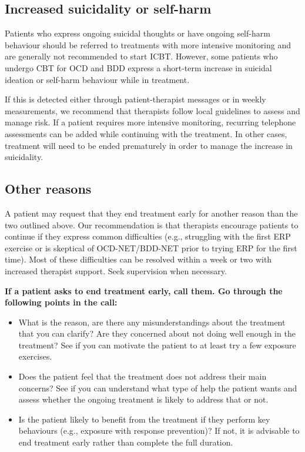 \documentclass[]{book}
\providecommand{\tightlist}{%
  \setlength{\itemsep}{0pt}\setlength{\parskip}{0pt}}
\theoremstyle{definition}
\theoremstyle{definition}
\theoremstyle{definition}
\theoremstyle{remark}
\begin{document}
\hypertarget{increased-suicidality-or-self-harm}{%
\subsection{Increased suicidality or
self-harm}\label{increased-suicidality-or-self-harm}}

Patients who express ongoing suicidal thoughts or have ongoing self-harm
behaviour should be referred to treatments with more intensive
monitoring and are generally not recommended to start ICBT. However,
some patients who undergo CBT for OCD and BDD express a short-term
increase in suicidal ideation or self-harm behaviour while in treatment.

If this is detected either through patient-therapist messages or in
weekly measurements, we recommend that therapists follow local
guidelines to assess and manage risk. If a patient requires more
intensive monitoring, recurring telephone assessments can be added while
continuing with the treatment. In other cases, treatment will need to be
ended prematurely in order to manage the increase in suicidality.

\hypertarget{other-reasons}{%
\subsection{Other reasons}\label{other-reasons}}

A patient may request that they end treatment early for another reason
than the two outlined above. Our recommendation is that therapists
encourage patients to continue if they express common difficulties
(e.g., struggling with the first ERP exercise or is skeptical of
OCD-NET/BDD-NET prior to trying ERP for the first time). Most of these
difficulties can be resolved within a week or two with increased
therapist support. Seek supervision when necessary.

\textbf{If a patient asks to end treatment early, call them. Go through
the following points in the call:}

\begin{itemize}
\tightlist
\item
  What is the reason, are there any misunderstandings about the
  treatment that you can clarify? Are they concerned about not doing
  well enough in the treatment? See if you can motivate the patient to
  at least try a few exposure exercises.\\
\item
  Does the patient feel that the treatment does not address their main
  concerns? See if you can understand what type of help the patient
  wants and assess whether the ongoing treatment is likely to address
  that or not.\\
\item
  Is the patient likely to benefit from the treatment if they perform
  key behaviours (e.g., exposure with response prevention)? If not, it
  is advisable to end treatment early rather than complete the full
  duration.
\end{itemize}
\end{document}
